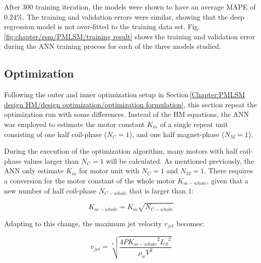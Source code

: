             
            After $300$ training iteration, the models were shown to have an average \acf{MAPE} of $0.24\%$. The training and validation errors were similar, showing that the deep regression model is not over-fitted to the training data set. Fig.\,\ref{fig:chapter/rsm/PMLSM/training result} shows the training and validation error during the \acs{ANN} training process for each of the three models studied.
            
        
        \subsection{Optimization}                   \label{Chapter:RSM/PMLSM/Optimization}
        
        
            Following the outer and inner optimization setup in Section\,\ref{Chapter:PMLSM design HM/design optimization/optimization formulation}, this section repeat the optimization run with some differences. Instead of the \acs{HM} equations, the \acs{ANN} was employed to estimate the motor constant $K_m$ of a single repeat unit consisting of one half coil-phase ($N_C = 1$), and one half magnet-phase ($N_M = 1$). 
            
            
            During the execution of the optimization algorithm, many motors with half coil-phase values larger than $N_C = 1$ will be calculated. As mentioned previously, the \acs{ANN} only estimate $K_m$ for motor unit with $N_C=1$ and $N_M=1$. There requires a conversion for the motor constant of the whole motor $K_{m-whole}$, given that a new number of half coil-phase $N_{C-whole}$ that is larger than $1$:
            
            
            \begin{equation}
                K_{m-whole}=K_m  \sqrt{N_{C-whole}}
                \label{eq:calculate new K_m based on new N_C}
            \end{equation}
            
            
            Adapting to this change, the maximum jet velocity $v_{jet}$ becomes:
            
            
            \begin{equation}
                v_{jet} = \sqrt[4]{\frac{4P {K_{m-whole}}^2 {L_S}^2}{\rho_w V^2}}
                \label{eq:calculate new v_jet based on new N_C}
            \end{equation}
            
